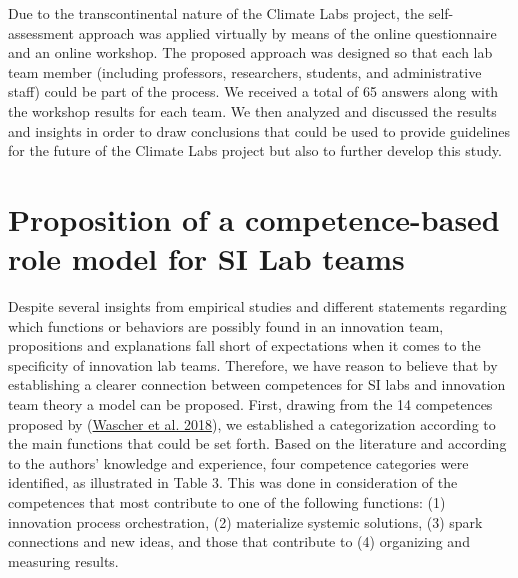 \documentclass[AMA,STIX1COL,APA,STIX2COL]{WileyNJD-v2}
\begin{document}
Due to the transcontinental nature of the Climate Labs project, the
self-assessment approach was applied virtually by means of the online
questionnaire and an online workshop. The proposed approach was designed
so that each lab team member (including professors, researchers,
students, and administrative staff) could be part of the process. We
received a total of 65 answers along with the workshop results for each
team. We then analyzed and discussed the results and insights in order
to draw conclusions that could be used to provide guidelines for the
future of the Climate Labs project but also to further develop this
study.

\hypertarget{proposition-of-a-competence-based-role-model-for-si-lab-teams}{%
\section{Proposition of a competence-based role model for SI Lab
teams}\label{proposition-of-a-competence-based-role-model-for-si-lab-teams}}

Despite several insights from empirical studies and different statements
regarding which functions or behaviors are possibly found in an
innovation team, propositions and explanations fall short of
expectations when it comes to the specificity of innovation lab teams.
Therefore, we have reason to believe that by establishing a clearer
connection between competences for SI labs and innovation team theory a
model can be proposed. First, drawing from the 14 competences proposed
by (\protect\hyperlink{ref-Wascher2018}{Wascher et al. 2018}), we
established a categorization according to the main functions that could
be set forth. Based on the literature and according to the authors'
knowledge and experience, four competence categories were identified, as
illustrated in Table 3. This was done in consideration of the
competences that most contribute to one of the following functions: (1)
innovation process orchestration, (2) materialize systemic solutions,
(3) spark connections and new ideas, and those that contribute to (4)
organizing and measuring results.

\providecommand{\docline}[3]{\noalign{\global\setlength{\arrayrulewidth}{#1}}\arrayrulecolor[HTML]{#2}\cline{#3}}

\setlength{\tabcolsep}{2pt}

\renewcommand*{\arraystretch}{1.5}
\end{document}
